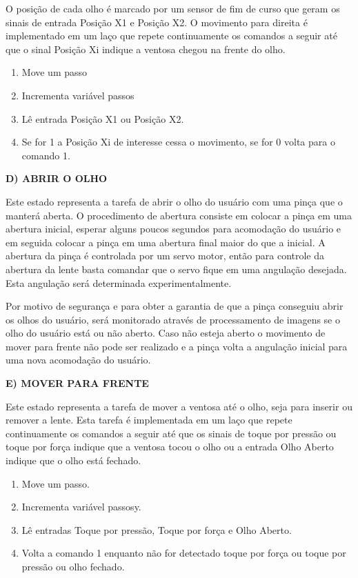 O posição de cada olho é marcado por um sensor de fim de curso que geram os sinais de entrada Posição X1 e Posição X2. O movimento para direita é implementado em um laço que repete continuamente os comandos a seguir até que o sinal Posição Xi indique a ventosa chegou na frente do olho.  

\begin{enumerate}
\item Move um passo 
\item Incrementa variável passos
\item Lê entrada Posição X1 ou Posição X2. 
\item Se for 1 a Posição Xi de interesse cessa o movimento, se for 0 volta para o comando 1.
\end{enumerate}


\textbf{D)	ABRIR O OLHO}

Este estado representa a tarefa de abrir o olho do usuário com uma pinça que o manterá aberta. O procedimento de abertura consiste em colocar a pinça em uma abertura inicial, esperar alguns poucos segundos para acomodação do usuário e em seguida colocar a pinça em uma abertura final maior do que a inicial. A abertura da pinça é controlada por um servo motor, então para controle da abertura da lente basta comandar que o servo fique em uma angulação desejada. Esta angulação será determinada experimentalmente. 

Por motivo de segurança e para obter a garantia de que a pinça conseguiu abrir os olhos do usuário, será monitorado através de processamento de imagens se o olho do usuário está ou não aberto. Caso não esteja aberto o movimento de mover para frente não pode ser realizado e a pinça volta a angulação inicial para uma nova acomodação do usuário. 


\textbf{E)	MOVER PARA FRENTE}

Este estado representa a tarefa de mover a ventosa até o olho, seja para inserir ou remover a lente. Esta tarefa é implementada em um laço que repete continuamente os comandos a seguir até que os sinais de toque por pressão ou toque por força indique que a ventosa tocou o olho ou a entrada Olho Aberto indique que o olho está fechado. 

\begin{enumerate}
\item Move um passo.
\item Incrementa variável passosy.
\item Lê entradas Toque por pressão, Toque por força e Olho Aberto. 
\item Volta a comando 1 enquanto não for detectado toque por força ou toque por pressão ou olho fechado.
\end{enumerate}

